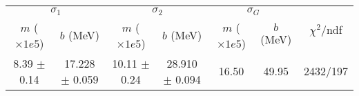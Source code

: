 \begin{tabular}{cc|cc|cc||c}
\multicolumn{2}{c|}{$\sigma_1$} & \multicolumn{2}{|c}{$\sigma_2$} & \multicolumn{2}{|c}{$\sigma_G$}  & \multirow{2}{*}{$\chi^2/$ndf}\\
$m$ ($\times1e5$) & $b$ (MeV) & $m$ ($\times1e5$) & $b$ (MeV) & $m$ ($\times1e5$) & $b$ (MeV) & \\
\hline
8.39 $\pm$ 0.14 & 17.228 $\pm$ 0.059 & 10.11 $\pm$ 0.24 & 28.910 $\pm$ 0.094 & 16.50 & 49.95 & 2432/197\\
\end{tabular}

